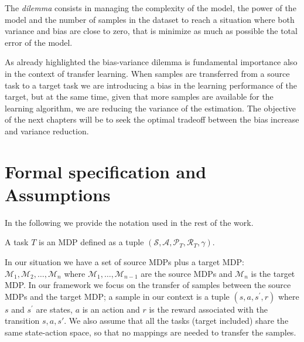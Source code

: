       	\noindent The \textit{dilemma} consists in managing the complexity of the model, the power of the model and the number of samples in the
      	dataset to reach a situation where both variance and bias are close to zero, that is minimize as much as possible the total error
      	of the model.

      	\noindent As already highlighted the bias-variance dilemma is fundamental importance also in the context of transfer learning.
      	When samples are transferred from a source task to a target task we are introducing a bias in the learning performance
      	of the target, but at the same time, given that more samples are available for the learning algorithm, we are reducing
      	the variance of the estimation. The objective of the next chapters will be to seek the optimal tradeoff between the
      	bias increase and variance reduction.

        \section{Formal specification and Assumptions}
          \noindent In the following we provide the notation used in the rest of the work.
          \begin{definition}
            A task $T$ is an MDP defined as a tuple $(\mathcal{S},\mathcal{A},\mathcal{P}_T,\mathcal{R}_T,\gamma)$.
          \end{definition}

          \noindent In our situation we have a set of source MDPs plus a target MDP: $\mathcal{M}_1,\mathcal{M}_2, \dots, \mathcal{M}_n$
          where $\mathcal{M}_1, \dots, \mathcal{M}_{n-1}$ are the source MDPs and $\mathcal{M}_n$ is the target MDP.\newline
          In our framework we focus on the transfer of samples between the source MDPs and the target MDP; a
          sample in our context is a tuple $(s,a,s^{'},r)$ where $s$ and $s^{'}$ are states, $a$ is an action and $r$ is the reward associated with the transition $s,a,s'$.\newline
          We also assume that all the tasks (target included) share the same state-action space, so that no mappings are needed
          to transfer the samples.\newline

